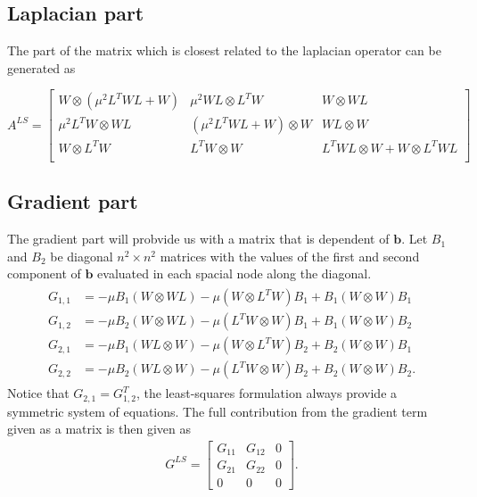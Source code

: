 \subsection{Laplacian part}
The part of the matrix which is closest related to the laplacian operator can be generated as 

$
A^{LS} = 
\begin{bmatrix}
	W \otimes (\mu^2 L^TWL+W) & \mu^2 WL \otimes L^TW 		 &	W \otimes WL  \\ 	
	\mu^2 L^TW \otimes WL     & (\mu^2 L^TWL+W) \otimes W  &	WL \otimes W  \\ 	
	W \otimes L^TW		  & L^TW \otimes W       &  L^TWL \otimes W +	W\otimes L^TWL  \\ 	
\end{bmatrix}
$

\subsection{Gradient part}
The gradient part will probvide us with a matrix that is dependent of $\mathbf{b}$. Let $B_1$ and $B_2$ be diagonal $n^2 \times n^2$ matrices with the values of the first and second component of $\mathbf{b}$ evaluated in each spacial node along the diagonal.  
\begin{align}
	\begin{split}
	G_{1,1} &= -\mu B_1 (W \otimes WL) -\mu( W \otimes L^TW) B_1 + B_1( W\otimes W) B_1 \\ 	
	G_{1,2} &= -\mu B_2 (W \otimes WL) -\mu (L^TW \otimes W) B_1 + B_1 (W\otimes W) B_2 \\
	G_{2,1} &= -\mu B_1 (WL \otimes W) -\mu (W \otimes L^TW) B_2 + B_2 (W\otimes W) B_1 \\
	G_{2,2} &= -\mu B_2 (WL \otimes W) -\mu (L^TW \otimes W) B_2 + B_2 (W\otimes W) B_2. 
	\end{split}
	\label{eq:additionalMatrixDiffTrans}
\end{align}
%
Notice that $G_{2,1} = G_{1,2}^T $, the least-squares formulation always provide a symmetric system of equations.
The full contribution from the gradient term given as a matrix is then given as  
%
\begin{align}
G^{LS}=
\begin{bmatrix}
	G_{11} & G_{12} &0 \\
	G_{21} & G_{22} &0 \\
	0 & 0 & 0 
\end{bmatrix}.
	\label{eq:GradientMatrix}
\end{align}
%
